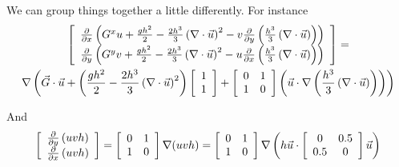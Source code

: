 \documentclass[12pt]{article}
\begin{document}
We can group things together a little differently. For instance
\begin{multline}
\left[ \begin{array}{c}
\frac{\partial }{\partial x} \left(G^xu + \frac{gh^2}{2} - \frac{2h^3}{3}\left(\nabla \cdot \vec{u}\right)^2 - v\frac{\partial}{\partial y}\left( \frac{h^3}{3} \left(\nabla \cdot \vec{u}\right)\right) \right) \\
\frac{\partial }{\partial y}\left(G^yv + \frac{gh^2}{2} - \frac{2h^3}{3}\left(\nabla \cdot \vec{u}\right)^2 - u\frac{\partial}{\partial x}\left( \frac{h^3}{3} \left(\nabla \cdot \vec{u}\right)\right)\right)
\end{array} \right] = \\
\nabla\left(\vec{G} \cdot \vec{u} + \left(\frac{gh^2}{2} - \frac{2h^3}{3}\left(\nabla \cdot \vec{u}\right)^2\right)\left[\begin{array}{c}
1 \\
1\\
\end{array}\right] + \left[\begin{array}{c c}
0 & 1 \\
1 & 0\\
\end{array}\right]\left(\vec{u} \cdot \nabla\left( \frac{h^3}{3} \left(\nabla \cdot \vec{u}\right)\right)\right)\right)
\end{multline}

And
\begin{equation}
\left[ \begin{array}{c}
\frac{\partial }{\partial y} \left(uvh \right) \\
\frac{\partial }{\partial x} \left(uvh \right)
\end{array} \right] = 
\left[\begin{array}{c c}
0 & 1 \\
1 & 0\\
\end{array}\right] \nabla (uvh)  = \left[\begin{array}{c c}
0 & 1 \\
1 & 0\\
\end{array}\right] \nabla \left(h \vec{u}\cdot\left[\begin{array}{c c}
0 & 0.5 \\
0.5 & 0\\
\end{array}\right]\vec{u} \right)
\end{equation}
\end{document}
